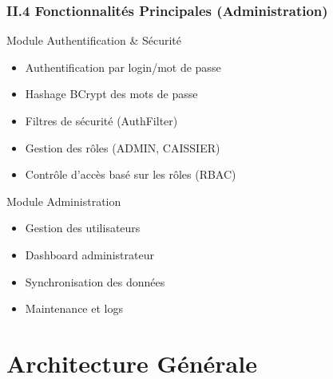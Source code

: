 \documentclass[11pt, aspectratio=169]{beamer}
\begin{document}
\begin{frame}
    \frametitle{II.4 Fonctionnalités Principales (Administration)}
    
    \begin{block}{Module Authentification \& Sécurité}
        \begin{itemize}
            \item[\faLock] Authentification par login/mot de passe
            \item[\faCryptocurrency] Hashage BCrypt des mots de passe
            \item[\faShield] Filtres de sécurité (AuthFilter)
            \item[\faUserTie] Gestion des rôles (ADMIN, CAISSIER)
            \item[\faUserCheck] Contrôle d'accès basé sur les rôles (RBAC)
        \end{itemize}
    \end{block}
    
    \vspace{0.8cm}
    
    \begin{block}{Module Administration}
        \begin{itemize}
            \item[\faUsers] Gestion des utilisateurs
            \item[\faChartPie] Dashboard administrateur
            \item[\faSync] Synchronisation des données
            \item[\faToolbox] Maintenance et logs
        \end{itemize}
    \end{block}
\end{frame}


\section{Architecture Générale}
\end{document}
